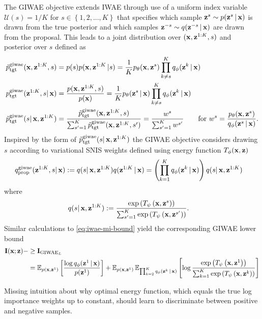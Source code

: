 The \gls{GIWAE} objective extends \gls{IWAE} through use of a uniform index variable $\mathcal{U}(s) = 1/K$ for $s \in \left\{1, 2, ..., K\right\}$ that specifies which sample $\vz^{s} \sim p(\vz^{s}|\vx)$ is drawn from the true posterior and which samples $\vz^{-s} \sim q(\vz^{-s}|\vx)$ are drawn from the proposal. This leads to a joint distribution over $(\vx, \vz^{1:K}, s)$ and posterior over $s$ defined as 
\begin{align}
    \ttgt^{\text{giwae}}(\vx, \vz^{1:K}, s) &= p(s)p(\vx, \vz^{1:K}| s) = \frac{1}{K} p_{\theta}(\vx, \vz^s) \prod_{k\ne s}^K q_{\phi}(\vz^k|\vx)\\
    \tgt^{\text{giwae}}(\vz^{1:K}, s | \vx ) &= \frac{p(\vx, \vz^{1:K}, s)}{p(\vx)} = \frac{1}{K} p_{\theta}(\vz^s | \vx) \prod_{k\ne s}^K q_{\phi}(\vz^k|\vx)\\
    \ttgt^{\text{giwae}}(s|\vx, \vz^{1:K}) &= \frac{\ttgt^{\text{giwae}}(\vx, \vz^{1:K},s)}{\sum_{s'=1}^K \ttgt^{\text{giwae}}(\vx, \vz^{1:K}, s')} = \frac{w^s}{\sum_{s'=1}^K w^{s'}} \quad \quad \text {for  } w^s = \frac{ p_{\theta}(\vx, \vz^s)}{q_{\phi}(\vz^s|\vx)}.
\end{align}
Inspired by the form of $\ttgt^{\text{giwae}}(s|\vx, \vz^{1:K})$ the \gls{GIWAE} objective considers drawing $s$ according to variational \gls{SNIS} weights defined using energy function $T_\phi(\vx,\vz)$
\begin{align}
    \prop^{\text{giwae}}(\vz^{1:K}, s|\vx) := q(s|\vx, \vz^{1:K})q(\vz^{1:K} |\vx) &= \left(\prod_{k=1}^K q_{\phi}(\vz^k|\vx)\right)q(s|\vx, \vz^{1:K})
\end{align}
where
\begin{align}
    q(s|\vx, \vz^{1:K}) &:= \frac{\exp\left(T_{\psi}\left(\vx, \vz^{s}\right)\right)}{\sum_{s'=1}^K \exp\left(T_{\psi}\left(\vx, \vz^{s'}\right)\right) }.
\end{align}
Similar calculations to \cref{eq:iwae-mi-bound} yield the corresponding \gls{GIWAE} lower bound 
\begin{align}
    \mathbf{I}(\vx ; \vz) - &\ge \mathbf{I}_{\text{GIWAE}_L} \\
    &= \E_{p(\vx, \vz^1)}\left[\frac{\log q_{\phi}(\vz^1|\vx)}{p(\vz^1)}\right] + \E_{p(\vx, \vz^1)}\E_{\prod_{k=2}^K q_{\phi}(\vz^k|\vx)}\left[\log \frac{\exp\left(T_{\psi}\left(\vx, \vz^1\right)\right)}{\sum_{k=1}^K \exp\left(T_{\psi}\left(\vx, \vz^{k}\right)\right) }\right]
\end{align}

\alert{Missing intuition about why optimal energy function, which equals the true log importance weights up to constant, should learn to discriminate between positive and negative samples. }

